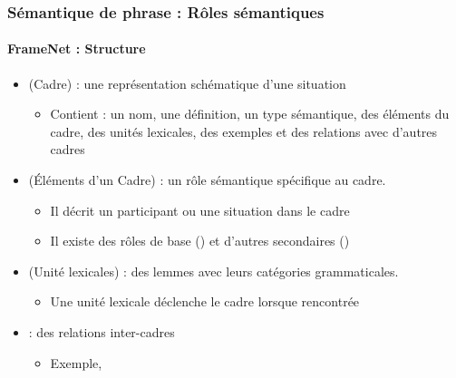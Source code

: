 \documentclass[xcolor=table]{beamer}
\begin{document}
\begin{frame}
	\frametitle{Sémantique de phrase : Rôles sémantiques}
	\framesubtitle{FrameNet : Structure}
	
	\begin{itemize}
		\item {} (Cadre) : une représentation schématique d'une situation
		\begin{itemize}
			\item Contient : un nom, une définition, un type sémantique, des éléments du cadre, des unités lexicales, des exemples et des relations avec d'autres cadres
		\end{itemize}
	
		\item {} (Éléments d'un Cadre) : un rôle sémantique spécifique au cadre. 
		\begin{itemize}
			\item Il décrit un participant ou une situation dans le cadre
			\item Il existe des rôles de base () et d'autres secondaires ()
		\end{itemize}
	
		\item {} (Unité lexicales) : des lemmes avec leurs catégories grammaticales.
		\begin{itemize}
			\item Une unité lexicale déclenche le cadre lorsque rencontrée
		\end{itemize}
	
		\item {} : des  relations inter-cadres
		\begin{itemize}
			\item Exemple, 
		\end{itemize}
	\end{itemize}
	
\end{frame}
\end{document}
